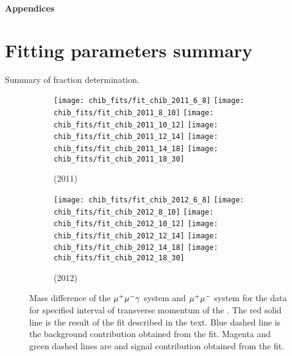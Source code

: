 
\clearpage

{\noindent\bf\Large Appendices}

\appendix

\section{Fitting parameters summary}
\label{sec:FitingParameters}


\begin{table}[t]
\caption{\small Summary of fraction determination.}
\scalebox{0.5}{

}
\label{tab:fit_summary}
\end{table}


\begin{figure}[ht]
  \centering
    \begin{subfigure}[b]{\textwidth}
      \centering
      \texttt{[image: chib\_fits/fit\_chib\_2011\_6\_8]}
      \texttt{[image: chib\_fits/fit\_chib\_2011\_8\_10]}
      \texttt{[image: chib\_fits/fit\_chib\_2011\_10\_12]}
      \texttt{[image: chib\_fits/fit\_chib\_2011\_12\_14]}
      \texttt{[image: chib\_fits/fit\_chib\_2011\_14\_18]}
      \texttt{[image: chib\_fits/fit\_chib\_2011\_18\_30]}
      \caption{\tev (2011)}
      \label{fig:chib_fits_2011}
    \end{subfigure}
    \begin{subfigure}[b]{\textwidth}
      \centering
      \texttt{[image: chib\_fits/fit\_chib\_2012\_6\_8]}
      \texttt{[image: chib\_fits/fit\_chib\_2012\_8\_10]}
      \texttt{[image: chib\_fits/fit\_chib\_2012\_10\_12]}
      \texttt{[image: chib\_fits/fit\_chib\_2012\_12\_14]}
      \texttt{[image: chib\_fits/fit\_chib\_2012\_14\_18]}
      \texttt{[image: chib\_fits/fit\_chib\_2012\_18\_30]}
      \caption{\tev (2012)}
      \label{fig:chib_fits_2012}
    \end{subfigure}
  \caption{
    \small  Mass difference of the $\mu^+\mu^- \gamma$ system and $\mu^+\mu^-$ system for the 
    data for specified interval of transverse momentum of the \OneS. The red
    solid line is the result of the fit described in the text. Blue dashed line 
    is the background contribution obtained from the fit. Magenta and green 
    dashed lines are \chibone and \chibtwo signal contribution obtained from the fit.
  }
  \label{fig:chib_fits}
\end{figure}




